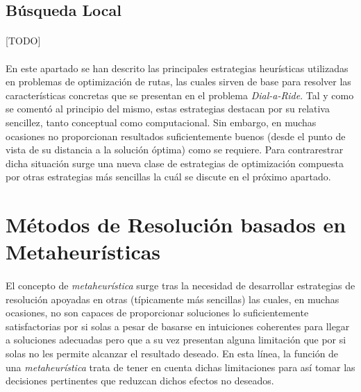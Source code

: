 \documentclass{subfiles}
\begin{document}
      \subsection{Búsqueda Local}
      \label{sec:solving_local_search}

        \paragraph{}
        [TODO]

      \paragraph{}
      En este apartado se han descrito las principales estrategias heurísticas utilizadas en problemas de optimización de rutas, las cuales sirven de base para resolver las características concretas que se presentan en el problema \emph{Dial-a-Ride}. Tal y como se comentó al principio del mismo, estas estrategias destacan por su relativa sencillez, tanto conceptual como computacional. Sin embargo, en muchas ocasiones no proporcionan resultados suficientemente buenos (desde el punto de vista de su distancia a la solución óptima) como se requiere. Para contrarestrar dicha situación surge una nueva clase de estrategias de optimización compuesta por otras estrategias más sencillas la cuál se discute en el próximo apartado.

    \section{Métodos de Resolución basados en Metaheurísticas}
    \label{sec:solving_metaheuristics}

      \paragraph{}
      El concepto de \emph{metaheurística} surge tras la necesidad de desarrollar estrategias de resolución apoyadas en otras (típicamente más sencillas) las cuales, en muchas ocasiones, no son capaces de proporcionar soluciones lo suficientemente satisfactorias por si solas a pesar de basarse en intuiciones coherentes para llegar a soluciones adecuadas pero que a su vez presentan alguna limitación que por si solas no les permite alcanzar el resultado deseado. En esta línea, la función de una \emph{metaheurística} trata de tener en cuenta dichas limitaciones para así tomar las decisiones pertinentes que reduzcan dichos efectos no deseados.
\end{document}
